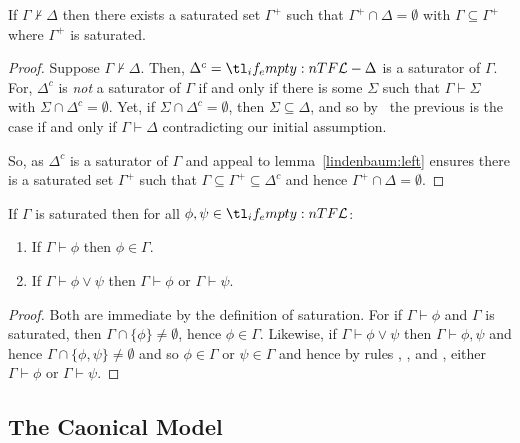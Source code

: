\documentclass[10pt]{article}
\begin{document}
\begin{corollary}[Saturation]
  If \(\Gamma \nvdash \Delta\) then there exists a saturated set \(\Gamma^{+}\) such that \(\Gamma^{+} \cap \Delta = \emptyset\) with \(\Gamma \subseteq \Gamma^{+}\) where \(\Gamma^{+}\) is saturated.
  \begin{proof}
        Suppose \(\Gamma \nvdash \Delta\).
    Then, \(\Delta^{c} = \olang{} - \Delta\) is a saturator of \(\Gamma\).
    For, \(\Delta^{c}\) is \emph{not} a saturator of \(\Gamma\) if and only if there is some \(\Sigma\) such that \(\Gamma \vdash \Sigma\) with \(\Sigma \cap \Delta^{c} = \emptyset\).
    Yet, if \(\Sigma \cap \Delta^{c} = \emptyset\), then \(\Sigma \subseteq \Delta\), and so by \ the previous is the case if and only if \(\Gamma \vdash \Delta\) contradicting our initial assumption.

    So, as \(\Delta^{c}\) is a saturator of \(\Gamma\) and appeal to lemma~\ref{lindenbaum:left} ensures there is a saturated set \(\Gamma^{+}\) such that \(\Gamma \subseteq \Gamma^{+} \subseteq \Delta^{c}\) and hence \(\Gamma^{+} \cap \Delta = \emptyset\).
  \end{proof}
\end{corollary}

\begin{proposition}
  If \(\Gamma\) is saturated then for all \(\phi,\psi \in \olang{}\):
  \begin{enumerate}
  \item If \(\Gamma \vdash \phi\) then \(\phi \in \Gamma\).
  \item If \(\Gamma \vdash \phi \lor \psi\) then \(\Gamma \vdash \phi\) or \(\Gamma \vdash \psi\).
  \end{enumerate}
  \begin{proof}
    Both are immediate by the definition of saturation.
    For if \(\Gamma \vdash \phi\) and \(\Gamma\) is saturated, then \(\Gamma \cap \{\phi\} \ne \emptyset\), hence \(\phi \in \Gamma\).
    Likewise, if \(\Gamma \vdash \phi \lor \psi\) then \(\Gamma \vdash \phi, \psi\) and hence \(\Gamma \cap \{\phi,\psi\} \ne \emptyset\) and so \(\phi \in \Gamma\) or \(\psi \in \Gamma\) and hence by rules , , and , either \(\Gamma \vdash \phi\) or \(\Gamma \vdash \psi\).
  \end{proof}
\end{proposition}

\subsection{The Caonical Model}
\label{sec:caonical-model}
\end{document}
